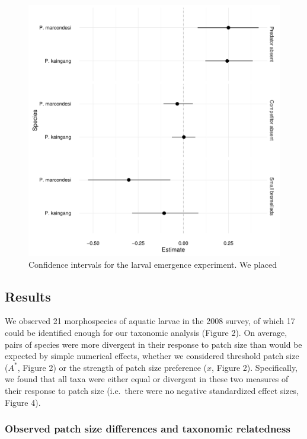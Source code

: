 \begin{figure}[htbp]
\centering
\includegraphics[width=5.5in]{figures/confints.pdf}
\caption[Confidence intervals for larval emergence experiment]{Confidence intervals for the larval emergence experiment. We placed }
\end{figure}


\subsection{Results}\label{results}

We observed 21 morphospecies of aquatic larvae in the 2008 survey, of
which 17 could be identified enough for our taxonomic analysis (Figure
2). On average, pairs of species were more divergent in their response
to patch size than would be expected by simple numerical effects,
whether we considered threshold patch size (\(A^{*}\), Figure 2) or the
strength of patch size preference (\(x\), Figure 2). Specifically, we
found that all taxa were either equal or divergent in these two measures
of their response to patch size (i.e.~there were no negative
standardized effect sizes, Figure 4).

\subsubsection{Observed patch size differences and taxonomic
relatedness}\label{observed-habitat-size-differences-and-taxonomic-relatedness}

